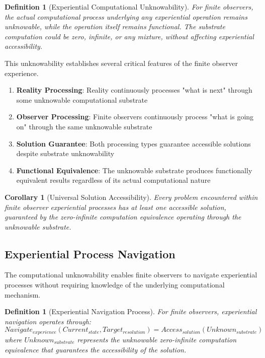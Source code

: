\documentclass{article}
\newtheorem{corollary}[theorem]{Corollary}
\newtheorem{definition}[theorem]{Definition}
\begin{document}
\begin{definition}[Experiential Computational Unknowability]
For finite observers, the actual computational process underlying any experiential operation remains unknowable, while the operation itself remains functional. The substrate computation could be zero, infinite, or any mixture, without affecting experiential accessibility.
\end{definition}

This unknowability establishes several critical features of the finite observer experience.

\begin{enumerate}
\item \textbf{Reality Processing}: Reality continuously processes "what is next" through some unknowable computational substrate
\item \textbf{Observer Processing}: Finite observers continuously process "what is going on" through the same unknowable substrate
\item \textbf{Solution Guarantee}: Both processing types guarantee accessible solutions despite substrate unknowability
\item \textbf{Functional Equivalence}: The unknowable substrate produces functionally equivalent results regardless of its actual computational nature
\end{enumerate}

\begin{corollary}[Universal Solution Accessibility]
Every problem encountered within finite observer experiential processes has at least one accessible solution, guaranteed by the zero-infinite computation equivalence operating through the unknowable substrate.
\end{corollary}

\subsection{Experiential Process Navigation}

The computational unknowability enables finite observers to navigate experiential processes without requiring knowledge of the underlying computational mechanism.

\begin{definition}[Experiential Navigation Process]
For finite observers, experiential navigation operates through:
\begin{equation}
Navigate_{experience}(Current_{state}, Target_{resolution}) = Access_{solution}(Unknown_{substrate})
\end{equation}
where $Unknown_{substrate}$ represents the unknowable zero-infinite computation equivalence that guarantees the accessibility of the solution.
\end{definition}
\end{document}
